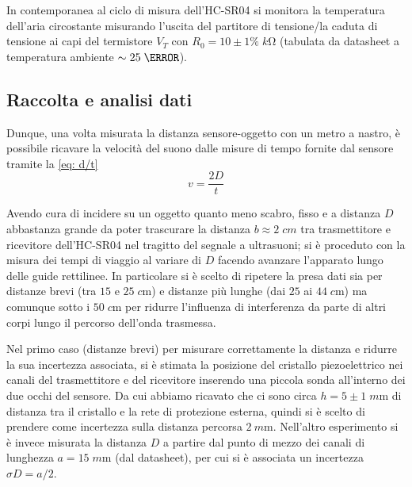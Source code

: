 \documentclass[10pt, a4paper, italian]{article}
\begin{document}
In contemporanea al ciclo di misura dell'HC-SR04 si monitora la temperatura
dell'aria circostante misurando l'uscita del partitore di tensione/la caduta
di tensione ai capi del termistore $V_T$ con $R_0 = 10 \pm 1 \percent \;
\si{k\ohm}$ (tabulata da datasheet a temperatura ambiente $\sim 25 \;
\degreeCelsius$).

\subsection{Raccolta e analisi dati}\label{sbs: data}
Dunque, una volta misurata la distanza sensore-oggetto con un metro a nastro,
è possibile ricavare la velocità del suono dalle misure di tempo fornite dal
sensore tramite la \cref{eq: d/t}
\begin{equation}\label{eq: d/t}
v = \frac{2 D}{t}
\end{equation}

Avendo cura di incidere su un oggetto quanto meno scabro, fisso e a distanza
$D$ abbastanza grande da poter trascurare la distanza $b \approx 2 \; \si{cm}$
tra trasmettitore e ricevitore dell'HC-SR04 nel tragitto del segnale a
ultrasuoni; si è proceduto con la misura dei tempi di viaggio al variare di
$D$ facendo avanzare l'apparato lungo delle guide rettilinee. In particolare
si è scelto di ripetere la presa dati sia per distanze brevi (tra $15$ e
$25 \; \si{c\m}$) e distanze più lunghe (dai $25$ ai $44 \; \si{c\m}$) ma
comunque sotto i $50 \; \si{c\m}$ per ridurre l'influenza di interferenza da
parte di altri corpi lungo il percorso dell'onda trasmessa.

Nel primo caso (distanze brevi) per misurare correttamente la distanza e
ridurre la sua incertezza associata, si è stimata la posizione del cristallo
piezoelettrico nei canali del trasmettitore e del ricevitore inserendo una
piccola sonda all'interno dei due occhi del sensore. Da cui abbiamo ricavato
che ci sono circa $h = 5 \pm 1 \; \si{m\m}$ di distanza tra il cristallo e la
rete di protezione esterna, quindi si è scelto di prendere come incertezza
sulla distanza percorsa $\SI{2}{m\m}$. Nell'altro esperimento si è invece
misurata la distanza $D$ a partire dal punto di mezzo dei canali di lunghezza
$a = 15 \; \si{m\m}$ (dal datasheet), per cui si è associata un incertezza
$\sigma D = a/2$.
\end{document}
